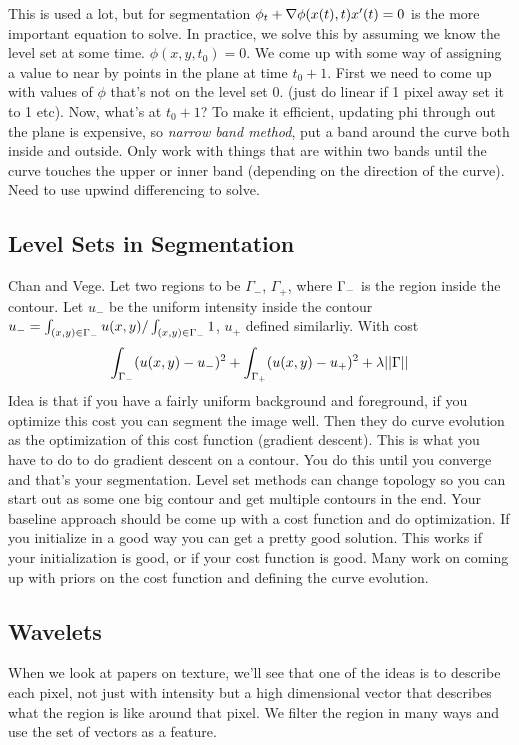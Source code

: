 This is used a lot, but for segmentation  $\phi_t + \nabla
\phi(x(t), t) x'(t) = 0$ is the more important equation to solve. In
practice, we solve this by assuming we know the level set at some
time. $\phi(x, y, t_0) = 0$. We come up with some way of assigning a
value to near by points in the plane at time $t_0 + 1$. First we need
to come up with values of $\phi$ that's not on the level set 0. (just
do linear if 1 pixel away set it to 1 etc). Now, what's at $t_0+1$? To
make it efficient, updating phi through out the plane is expensive, so
\emph{narrow band method}, put a band around the curve both inside and
outside. Only work with things that are within two bands until the
curve touches the upper or inner band (depending on the direction of
the curve). Need to use upwind differencing to solve. 

\subsection{Level Sets in Segmentation}
\label{sec:segmentation}
Chan and Vege. Let two regions to be $\Gamma_-$, $\Gamma_+$, where
$\Gamma_-$ is the region inside the contour. Let $u_-$ be the uniform
intensity inside the contour $u_- = \int_{(x,y) \in \Gamma_-} u(x,y)/
\int_{(x,y)\in \Gamma_-} 1$, $u_+$ defined similarliy. With cost
$$\int_{\Gamma_-} (u(x,y) - u_-)^2 + \int_{\Gamma_+} (u(x,y) - u_+)^2 +
\lambda || \Gamma ||$$
Idea is that if you have a fairly uniform background and foreground,
if you optimize this cost you can segment the image well. Then they do
curve evolution as the optimization of this cost function (gradient descent). This is what
you have to do to do gradient descent on a contour. You do this until
you converge and that's your segmentation. Level set methods can
change topology so you can start out as some one big contour and get
multiple contours in the end. 
Your baseline approach should be come up with a cost function and do
optimization. If you initialize in a good way you can get a pretty
good solution. This works if your initialization is good, or if your
cost function is good. Many work on coming up with priors on the cost
function and defining the curve evolution. 

\subsection{Wavelets}
\label{sec:wavelets}
When we look at papers on texture, we'll see that one of the ideas is
to describe each pixel, not just with intensity but a high dimensional
vector that describes what the region is like around that pixel. We
filter the region in many ways and use the set of vectors as a
feature. 

